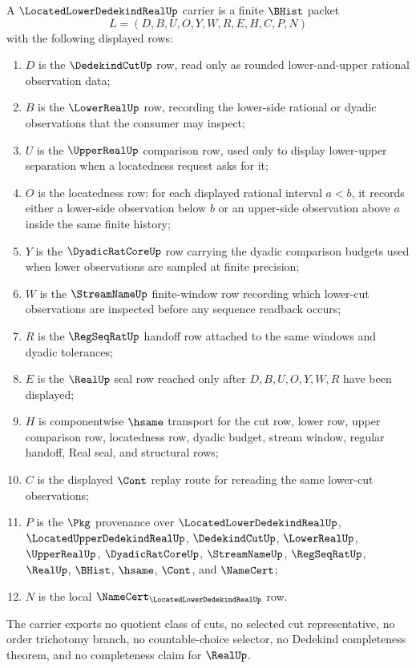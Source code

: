 \begin{definition}
\label{def:located-lower-dedekind-real-carrier}
A $\LocatedLowerDedekindRealUp$ carrier is a finite $\BHist$ packet
$$
L=(D,B,U,O,Y,W,R,E,H,C,P,N)
$$
with the following displayed rows:
\begin{enumerate}
\item $D$ is the $\DedekindCutUp$ row, read only as rounded lower-and-upper rational observation data;
\item $B$ is the $\LowerRealUp$ row, recording the lower-side rational or dyadic observations that the consumer may inspect;
\item $U$ is the $\UpperRealUp$ comparison row, used only to display lower-upper separation when a locatedness request asks for it;
\item $O$ is the locatedness row: for each displayed rational interval $a<b$, it records either a lower-side observation below $b$ or an upper-side observation above $a$ inside the same finite history;
\item $Y$ is the $\DyadicRatCoreUp$ row carrying the dyadic comparison budgets used when lower observations are sampled at finite precision;
\item $W$ is the $\StreamNameUp$ finite-window row recording which lower-cut observations are inspected before any sequence readback occurs;
\item $R$ is the $\RegSeqRatUp$ handoff row attached to the same windows and dyadic tolerances;
\item $E$ is the $\RealUp$ seal row reached only after $D,B,U,O,Y,W,R$ have been displayed;
\item $H$ is componentwise $\hsame$ transport for the cut row, lower row, upper comparison row, locatedness row, dyadic budget, stream window, regular handoff, Real seal, and structural rows;
\item $C$ is the displayed $\Cont$ replay route for rereading the same lower-cut observations;
\item $P$ is the $\Pkg$ provenance over $\LocatedLowerDedekindRealUp$, $\LocatedUpperDedekindRealUp$, $\DedekindCutUp$, $\LowerRealUp$, $\UpperRealUp$, $\DyadicRatCoreUp$, $\StreamNameUp$, $\RegSeqRatUp$, $\RealUp$, $\BHist$, $\hsame$, $\Cont$, and $\NameCert$;
\item $N$ is the local $\NameCert_{\LocatedLowerDedekindRealUp}$ row.
\end{enumerate}
The carrier exports no quotient class of cuts, no selected cut representative, no order trichotomy branch, no countable-choice selector, no Dedekind completeness theorem, and no completeness claim for $\RealUp$.
\end{definition}

